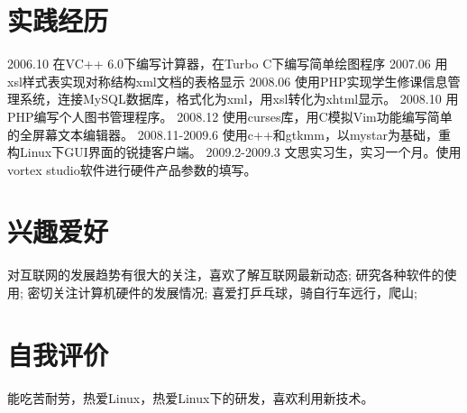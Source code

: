 \documentclass[a4paper]{moderncvwutaob}
\begin{document}
\begin{CJK*}{UTF8}{gbsn}
\section{实践经历}
\cvitem
{
	2006.10
}
{
	在VC++ 6.0下编写计算器，在Turbo C下编写简单绘图程序
}
\cvitem
{
	2007.06
}
{
	用xsl样式表实现对称结构xml文档的表格显示
}
\cvitem
{
	2008.06
}
{
使用PHP实现学生修课信息管理系统，连接MySQL数据库，格式化为xml，用xsl转化为xhtml显示。
}
\cvitem
{
	2008.10
}
{
		用PHP编写个人图书管理程序。
}
\cvitem
{
	2008.12
}
{
	使用curses库，用C模拟Vim功能编写简单的全屏幕文本编辑器。
}
\cvitem
{
	2008.11-2009.6
}
{
    使用c++和gtkmm，以mystar为基础，重构Linux下GUI界面的锐捷客户端。
}
\cvitem
{
	2009.2-2009.3
}
{
	文思实习生，实习一个月。使用vortex studio软件进行硬件产品参数的填写。
}
\section{兴趣爱好}
\cvitem{}
{
	\small 对互联网的发展趋势有很大的关注，喜欢了解互联网最新动态;
	研究各种软件的使用;
	密切关注计算机硬件的发展情况;
	喜爱打乒乓球，骑自行车远行，爬山;
}
\section{自我评价}
\cvitem{}{}
{
	能吃苦耐劳，热爱Linux，热爱Linux下的研发，喜欢利用新技术。
}
\closesection
\end{CJK*}
\end{document}
